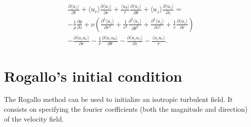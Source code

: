 \documentclass[oneside,a4paper,11pt]{report}
\newcommand{\pavg}{\overline{p}}
\begin{document}
\begin{align}
&\frac{\partial \langle u_z \rangle}{\partial t} + \langle u_r \rangle \frac{\partial \langle u_z \rangle}{\partial r} + \frac{\langle u_\theta \rangle}{r} \frac{\partial \langle u_z \rangle}{\partial \theta} + \langle u_z \rangle \frac{\partial \langle u_z \rangle}{\partial z} =  \nonumber \\
&-\frac{1}{\rho} \frac{\partial \pavg}{\partial z} + \nu \left ( \frac{\partial^2 \langle u_z \rangle}{\partial r^2} + \frac{1}{r^2} \frac{\partial^2 \langle u_z \rangle}{\partial \theta^2} + \frac{\partial^2 \langle u_z \rangle}{\partial z^2} + \frac{1}{r} \frac{\partial \langle u_z \rangle}{\partial r} \right ) \nonumber \\
&- \frac{\partial \langle u_z u_r \rangle}{\partial r} - \frac{1}{r} \frac{\partial \langle u_z u_\theta \rangle}{\partial \theta} - \frac{\partial \langle u_z u_z \rangle}{\partial z} - \frac{\langle u_z u_r \rangle}{r}.
\end{align}

%
\chapter{Rogallo's initial condition}
%
The Rogallo method \cite{rogallo1981} can be used to initialize an isotropic turbulent field. It consists on specifying the fourier coefficients (both the magnitude and direction) of the velocity field.

\end{document}
